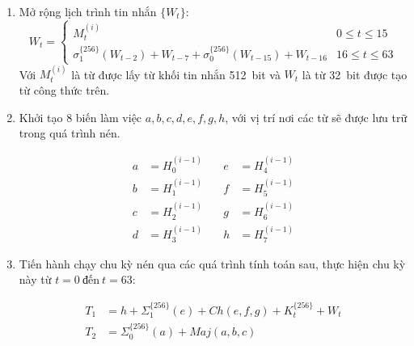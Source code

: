\begin{enumerate}[label=\textbf{Bước \arabic*:}, leftmargin = 2.5cm]
	\item Mở rộng lịch trình tin nhắn $\{W_t\}$:
		\[
		W_t = \begin{cases} 
				M_t^{(i)} & 0 \leq t \leq 15 \\
				\sigma_1^{\{256\}}(W_{t-2}) + W_{t-7} + \sigma_0^{\{256\}}(W_{t-15}) + W_{t-16} & 16 \leq t \leq 63 
			  \end{cases}
		\]
	Với $M_t^{(i)}$ là từ được lấy từ khối tin nhắn 512~bit và $W_t$ là từ 32~bit được tạo từ công thức trên.
	
	\item Khởi tạo 8 biến làm việc $a,b,c,d,e,f,g,h$, với vị trí nơi các từ sẽ được lưu trữ trong quá trình nén.
	
	\begin{align*}
a &= H_0^{(i-1)} \quad & e &= H_4^{(i-1)} \\
b &= H_1^{(i-1)} \quad & f &= H_5^{(i-1)} \\
c &= H_2^{(i-1)} \quad & g &= H_6^{(i-1)} \\
d &= H_3^{(i-1)} \quad & h &= H_7^{(i-1)}
	\end{align*}

	\item Tiến hành chạy chu kỳ nén qua các quá trình tính toán sau, thực hiện chu kỳ này từ $t = 0~ \text{đến} ~t = 63$:
	
	\begin{align*}
		T_1 &= h + \Sigma_1^{\{256\}}(e)+Ch(e,f,g)+K_t^{\{256\}}+ W_t \\
		T_2 &= \Sigma_0^{\{256\}}(a) + Maj(a,b,c) \\
 	

\end{align*}
\end{enumerate}
